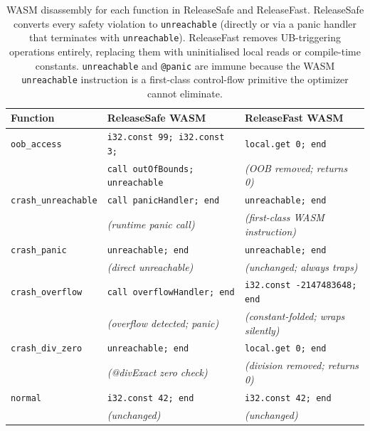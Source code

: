\documentclass[11pt,a4paper]{article}
\begin{document}
\begin{table}[h]
\centering
\begin{tabular}{lll}
\toprule
\textbf{Function} & \textbf{ReleaseSafe WASM} & \textbf{ReleaseFast WASM} \\
\midrule
\texttt{oob\_access}
  & \texttt{i32.const 99; i32.const 3;}
  & \texttt{local.get 0; end} \\
  & \texttt{call outOfBounds; unreachable}
  & \textit{(OOB removed; returns 0)} \\[4pt]

\texttt{crash\_unreachable}
  & \texttt{call panicHandler; end}
  & \texttt{unreachable; end} \\
  & \textit{(runtime panic call)}
  & \textit{(first-class WASM instruction)} \\[4pt]

\texttt{crash\_panic}
  & \texttt{unreachable; end}
  & \texttt{unreachable; end} \\
  & \textit{(direct unreachable)}
  & \textit{(unchanged; always traps)} \\[4pt]

\texttt{crash\_overflow}
  & \texttt{call overflowHandler; end}
  & \texttt{i32.const -2147483648; end} \\
  & \textit{(overflow detected; panic)}
  & \textit{(constant-folded; wraps silently)} \\[4pt]

\texttt{crash\_div\_zero}
  & \texttt{unreachable; end}
  & \texttt{local.get 0; end} \\
  & \textit{(@divExact zero check)}
  & \textit{(division removed; returns 0)} \\[4pt]

\texttt{normal}
  & \texttt{i32.const 42; end}
  & \texttt{i32.const 42; end} \\
  & \textit{(unchanged)}
  & \textit{(unchanged)} \\
\bottomrule
\end{tabular}
\caption{WASM disassembly for each function in ReleaseSafe and ReleaseFast.
         ReleaseSafe converts every safety violation to \texttt{unreachable}
         (directly or via a panic handler that terminates with \texttt{unreachable}).
         ReleaseFast removes UB-triggering operations entirely, replacing them
         with uninitialised local reads or compile-time constants.
         \texttt{unreachable} and \texttt{@panic} are immune because the WASM
         \texttt{unreachable} instruction is a first-class control-flow
         primitive the optimizer cannot eliminate.}
\label{tab:disasm}
\end{table}
\end{document}
